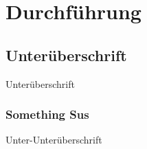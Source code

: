 
\chapter{Durchführung}\label{ch:durchfuhrung}

\section{Unterüberschrift}
    Unterüberschrift

    \subsection{Something Sus} %
        Unter-Unterüberschrift
